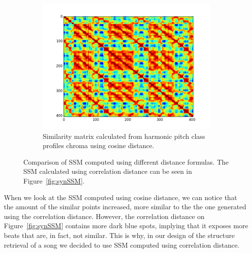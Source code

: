 \begin{figure}[t]
\begin{subfigure}[b]{0.31\textwidth}
                \label{fig:manhattan}
        \end{subfigure}
         \begin{subfigure}[b]{0.31\textwidth}
                \includegraphics[width=\textwidth]{Figures/ssm_cosine}
                \caption{Similarity matrix calculated from harmonic pitch class profiles chroma using cosine distance.}
                \label{fig:cosine}
        \end{subfigure}
          \caption{Comparison of SSM computed using different distance formulas. The SSM calculated using correlation distance can be seen in Figure~\ref{fig:synSSM}.}
        \label{fig:ssmdistance}
\end{figure}


When we look at the SSM computed using cosine distance, we can notice that the amount of the similar points increased, more similar to the the one generated using the correlation distance. However, the correlation distance on Figure~\ref{fig:synSSM} contains more dark blue spots, implying that it exposes more beats that are, in fact, not similar. This is why, in our design of the structure retrieval of a song we decided to use SSM computed using correlation distance.

\vspace{10pt}

